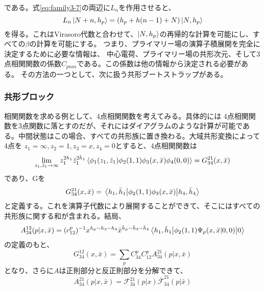 \documentclass[11pt, aps, longbibliography]{article}
\numberwithin{equation}{section}
\begin{document}
        である。式\eqref{eq:family3-7}の両辺に$L_n$を作用させると、
        \begin{equation}\label{eq:family3-11}
            L_n\ket{N+n,h_p} = (h_p+h(n-1)+N) \ket{N,h_p}
        \end{equation}
        を得る。これはVirasoro代数と合わせて、$\ket{N,h_p}$の再帰的な計算を可能にし、すべての$\beta$の計算を可能にする。
        つまり、プライマリー場の演算子積展開を完全に決定するために必要な情報は、
        中心電荷、プライマリー場の共形次元、そして3点相関関数の係数$C_{pnm}$である。この係数は他の情報から決定される必要がある。
        その方法の一つとして、次に扱う共形ブートストラップがある。

        \subsubsection{共形ブロック}
        相関関数を求める例として、4点相関関数を考えてみる。具体的には
        4点相関関数を3点関数に落とすのだが、それにはダイアグラムのような計算が可能である。中間状態はこの場合、すべての共形族に置き換わる。大域共形変換によって4点を
        $z_1=\infty, z_2=1, z_3=x,z_4=0$とすると、4点相関関数は
        \begin{equation}\label{eq:family4-1}
            \lim_{z_1,\bar{z}_1\rightarrow \infty}z_1^{2h_1}\bar{z}_1^{2\bar{h}_1}\expval{\phi_1(z_1,\bar{z}_1)\phi_2(1,1)\phi_3(x,\bar{x})\phi_4(0,0)} = G_{34}^{21}(x,\bar{x})
        \end{equation}
        であり、Gを
        \begin{equation}\label{eq:family4-2}
            G_{34}^{21}(x,\bar{x}) = \matrixel{h_1,\bar{h}_1}{\phi_2(1,1)\phi_3(x,\bar{x})}{h_4,\bar{h}_4}
        \end{equation}
        と定義する。これを演算子代数により展開することができて、そこにはすべての共形族に関する和が含まれる。結局、
        \begin{equation}\label{eq:family4-3}
            A_{34}^{12}(p|x,\bar{x}) = (c_{12}^p)^{-1}x^{h_p-h_3-h_4}\bar{x}^{\bar{h}_p-\bar{h}_3-\bar{h}_4}\matrixel{h_1,\bar{h}_1}{\phi_2(1,1)\Psi_p(x,\bar{x}|0,0)}{0}
        \end{equation}
        の定義のもと、
        \begin{equation}\label{eq:family4-4}
            G_{34}^{12}(x,\bar{x})=\sum_{p}C_{34}^pC_{12}^pA_{34}^{21}(p|x,\bar{x})
        \end{equation}
        となり、さらに$A$は正則部分と反正則部分を分解できて、
        \begin{equation}\label{eq:family4-5}
            A_{34}^{21}(p|x,\bar{x}) = \mathcal{F}_{34}^{21}(p|x)\bar{\mathcal{F}}_{34}^{21}(p|\bar{x})
        \end{equation}
\end{document}
